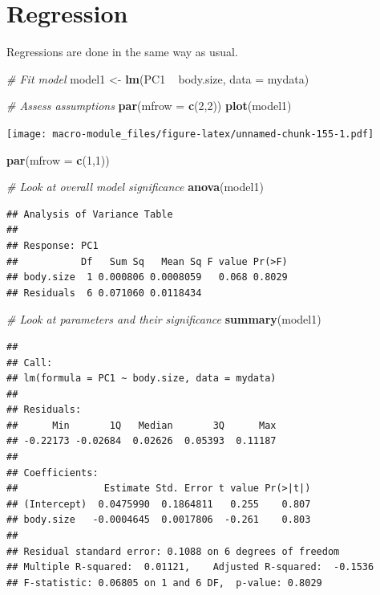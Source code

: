 \documentclass[]{book}
\newenvironment{Shaded}{\begin{snugshade}}{\end{snugshade}}
\newcommand{\KeywordTok}[1]{\textcolor[rgb]{0.13,0.29,0.53}{\textbf{{#1}}}}
\newcommand{\DataTypeTok}[1]{\textcolor[rgb]{0.13,0.29,0.53}{{#1}}}
\newcommand{\DecValTok}[1]{\textcolor[rgb]{0.00,0.00,0.81}{{#1}}}
\newcommand{\StringTok}[1]{\textcolor[rgb]{0.31,0.60,0.02}{{#1}}}
\newcommand{\CommentTok}[1]{\textcolor[rgb]{0.56,0.35,0.01}{\textit{{#1}}}}
\newcommand{\NormalTok}[1]{{#1}}
\begin{document}
\section{Regression}\label{regression}

Regressions are done in the same way as usual.

\begin{Shaded}
\begin{Highlighting}[]
\CommentTok{# Fit model}
\NormalTok{model1 <-}\StringTok{ }\KeywordTok{lm}\NormalTok{(PC1 ~}\StringTok{ }\NormalTok{body.size, }\DataTypeTok{data =} \NormalTok{mydata)}

\CommentTok{# Assess assumptions}
\KeywordTok{par}\NormalTok{(}\DataTypeTok{mfrow =} \KeywordTok{c}\NormalTok{(}\DecValTok{2}\NormalTok{,}\DecValTok{2}\NormalTok{))}
\KeywordTok{plot}\NormalTok{(model1)}
\end{Highlighting}
\end{Shaded}

\texttt{[image: macro-module\_files/figure-latex/unnamed-chunk-155-1.pdf]}

\begin{Shaded}
\begin{Highlighting}[]
\KeywordTok{par}\NormalTok{(}\DataTypeTok{mfrow =} \KeywordTok{c}\NormalTok{(}\DecValTok{1}\NormalTok{,}\DecValTok{1}\NormalTok{))}

\CommentTok{# Look at overall model significance}
\KeywordTok{anova}\NormalTok{(model1)}
\end{Highlighting}
\end{Shaded}

\begin{verbatim}
## Analysis of Variance Table
## 
## Response: PC1
##           Df   Sum Sq   Mean Sq F value Pr(>F)
## body.size  1 0.000806 0.0008059   0.068 0.8029
## Residuals  6 0.071060 0.0118434
\end{verbatim}

\begin{Shaded}
\begin{Highlighting}[]
\CommentTok{# Look at parameters and their significance}
\KeywordTok{summary}\NormalTok{(model1)}
\end{Highlighting}
\end{Shaded}

\begin{verbatim}
## 
## Call:
## lm(formula = PC1 ~ body.size, data = mydata)
## 
## Residuals:
##      Min       1Q   Median       3Q      Max 
## -0.22173 -0.02684  0.02626  0.05393  0.11187 
## 
## Coefficients:
##               Estimate Std. Error t value Pr(>|t|)
## (Intercept)  0.0475990  0.1864811   0.255    0.807
## body.size   -0.0004645  0.0017806  -0.261    0.803
## 
## Residual standard error: 0.1088 on 6 degrees of freedom
## Multiple R-squared:  0.01121,    Adjusted R-squared:  -0.1536 
## F-statistic: 0.06805 on 1 and 6 DF,  p-value: 0.8029
\end{verbatim}
\end{document}
